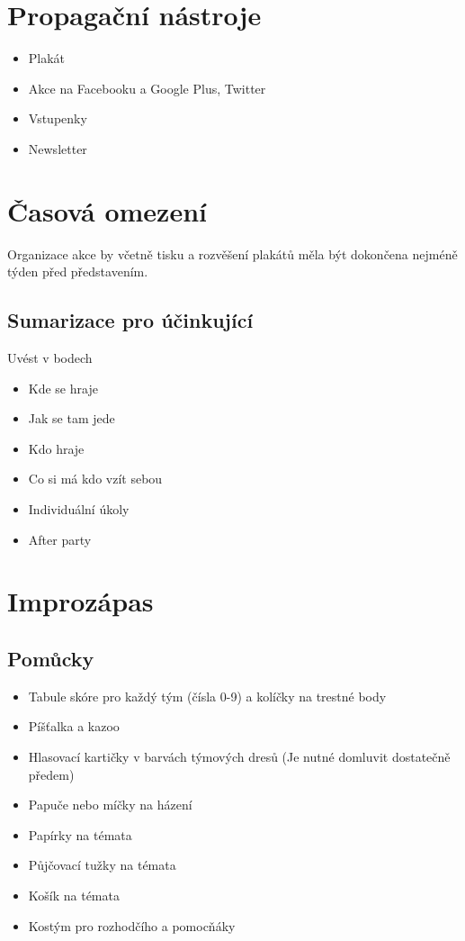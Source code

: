 \documentclass[main.tex]{subfiles}
\begin{document}
\section{Propagační nástroje} \begin{itemize}
\item Plakát
\item Akce na Facebooku a Google Plus, Twitter
\item Vstupenky
\item Newsletter
\end{itemize}
 
\section{Časová omezení} Organizace akce by včetně tisku a rozvěšení plakátů měla být dokončena nejméně týden před představením. 
\subsection{Sumarizace pro účinkující} Uvést v bodech 
\begin{itemize}
\item Kde se hraje
\item Jak se tam jede
\item Kdo hraje
\item Co si má kdo vzít sebou
\item Individuální úkoly
\item After party
\end{itemize}
\section{Improzápas} \subsection{Pomůcky} \begin{itemize}
\item Tabule skóre pro každý tým (čísla 0-9) a kolíčky na trestné body
\item Píšťalka a kazoo
\item Hlasovací kartičky v barvách týmových dresů (Je nutné domluvit dostatečně předem)
\item Papuče nebo míčky na házení
\item Papírky na témata
\item Půjčovací tužky na témata
\item Košík na témata
\item Kostým pro rozhodčího a pomocňáky
\end{itemize}
\end{document}
